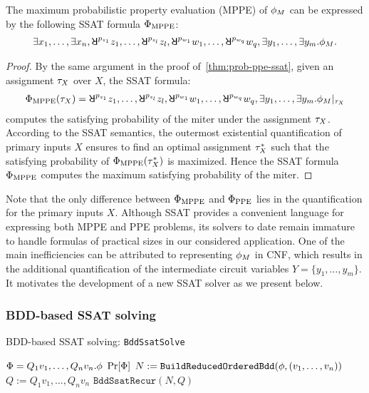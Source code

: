 \begin{theorem}
    \label{thm:prob-mppe-ssat}
    The maximum probabilistic property evaluation (MPPE) of $\phi_M$ can be expressed
    by the following SSAT formula $\Phi_\mathrm{MPPE}$:
    \begin{align}
        \label{eq:prob-mppe-ssat}
        \exists x_1,\ldots,\exists x_n,
        \random{p_{z_1}}z_1,\ldots,\random{p_{z_l}}z_l,
        \random{p_{w_1}}w_1,\ldots,\random{p_{w_q}}w_q,
        \exists y_1,\ldots,\exists y_m.
        \pf_M.
    \end{align}
\end{theorem}
\begin{proof}
    By the same argument in the proof of~\cref{thm:prob-ppe-ssat},
    given an assignment $\tau_X$ over $X$,
    the SSAT formula:
    \begin{align*}
        \Qf_\mathrm{MPPE}(\as_X)=
        \random{p_{z_1}}{z_1},\ldots,\random{p_{z_l}}{z_l},
        \random{p_{w_1}}{w_1},\ldots,\random{p_{w_q}}{w_q},
        \exists y_1,\ldots,\exists y_m.
        \pcf{\pf_M}{\as_X}
    \end{align*}
    computes the satisfying probability of the miter under the assignment $\tau_X$.
    According to the SSAT semantics,
    the outermost existential quantification of primary inputs $X$
    ensures to find an optimal assignment $\tau_X^*$
    such that the satisfying probability of $\Phi_\mathrm{MPPE}(\tau_X^*)$ is maximized.
    Hence the SSAT formula $\Phi_\mathrm{MPPE}$ computes the maximum satisfying probability of the miter.
\end{proof}

Note that the only difference between $\Phi_\mathrm{MPPE}$ and $\Phi_\mathrm{PPE}$
lies in the quantification for the primary inputs $X$.
Although SSAT provides a convenient language for expressing both MPPE and PPE problems,
its solvers to date remain immature to handle formulas of practical sizes in our considered application.
One of the main inefficiencies can be attributed to representing $\phi_M$ in CNF,
which results in the additional quantification of the intermediate circuit variables $Y=\{y_1,\ldots,y_m\}$.
It motivates the development of a new SSAT solver as we present below.

\subsubsection{BDD-based SSAT solving}

\begin{algorithm}[t]
    \caption{BDD-based SSAT solving: \texttt{BddSsatSolve}}
    \label{alg:bddssat}
    \begin{algorithmic}[1]
        \REQUIRE $\Phi=Q_1 v_1,\ldots,Q_n v_n.\phi$
        \ENSURE $\Pr[\Phi]$
        \STATE $N := \texttt{BuildReducedOrderedBdd}(\phi,(v_1,\ldots,v_n))$\label{code:bddssat-build-bdd}
        \STATE $Q := Q_1 v_1,\ldots,Q_n v_n$
        \RETURN $\texttt{BddSsatRecur}(N,Q)$\label{code:bddssat-recursive}
    \end{algorithmic}
\end{algorithm}

